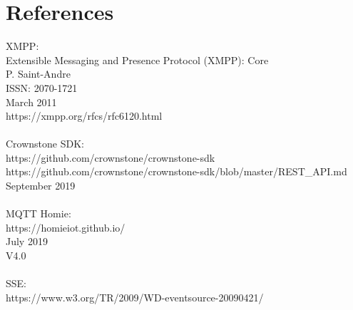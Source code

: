 \documentclass{article}
\begin{document}
\cleardoublepage
\section{References}\label{sec:references}

XMPP:\\
Extensible Messaging and Presence Protocol (XMPP): Core\\
P. Saint-Andre\\
ISSN: 2070-1721\\
March 2011\\
https://xmpp.org/rfcs/rfc6120.html \\
\\
Crownstone SDK: \\
https://github.com/crownstone/crownstone-sdk\\
https://github.com/crownstone/crownstone-sdk/blob/master/REST_API.md\\
September 2019\\
\\
MQTT Homie:\\
https://homieiot.github.io/\\
July 2019\\
V4.0\\
\\
SSE:\\
https://www.w3.org/TR/2009/WD-eventsource-20090421/\\

\end{document}

